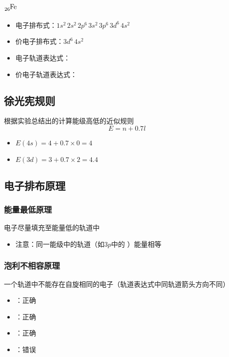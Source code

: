 \documentclass[a4paper]{article}
\begin{document}
	\paragraph{$\ce{_{26}Fe}$}
	\begin{itemize}
		\item 电子排布式：$1s^2\,2s^2\,2p^6\,3s^2\,3p^6\,3d^6\,4s^2$
		\item 价电子排布式：$3d^6\,4s^2$
		\item 电子轨道表达式：\fbox{$\uparrow\downarrow$}\quad\fbox{$\uparrow\downarrow$}\quad\fbox{$\uparrow\downarrow$}\fbox{$\uparrow\downarrow$}\fbox{$\uparrow\downarrow$}\quad\fbox{$\uparrow\downarrow$}\quad\fbox{$\uparrow\downarrow$}\fbox{$\uparrow\downarrow$}\fbox{$\uparrow\downarrow$}\quad\fbox{$\uparrow\downarrow$}\fbox{$\uparrow\ $}\fbox{$\uparrow\ $}\fbox{$\uparrow\ $}\fbox{$\uparrow\ $}\quad\fbox{$\uparrow\downarrow$}
		\item 价电子轨道表达式：\fbox{$\uparrow\downarrow$}\fbox{$\uparrow\ $}\fbox{$\uparrow\ $}\fbox{$\uparrow\ $}\fbox{$\uparrow\ $}\quad\fbox{$\uparrow\downarrow$}
	\end{itemize}
	
	

	\subsection{徐光宪规则}
	根据实验总结出的计算能级高低的近似规则
	$$E=n+0.7l$$
	\begin{itemize}
		\item $E(4s)=4+0.7\times 0=4$
		\item $E(3d)=3+0.7\times 2=4.4$
	\end{itemize}


	\subsection{电子排布原理}
	\subsubsection{能量最低原理}
	电子尽量填充至能量低的轨道中
	\begin{itemize}
		\item 注意：同一能级中的轨道（如$3p$中的 \fbox{$\ \ $}\fbox{$\ \ $}\fbox{$\ \ $} ）能量相等
	\end{itemize}
	\subsubsection{泡利不相容原理}
	一个轨道中不能存在自旋相同的电子（轨道表达式中同轨道箭头方向不同）
	\begin{itemize}
		\item \fbox{$\uparrow\ $}：正确
		\item \fbox{$\ \downarrow$}：正确
		\item \fbox{$\uparrow\downarrow$}：正确
		\item \fbox{$\uparrow\uparrow$}：错误
	\end{itemize}
\end{document}
